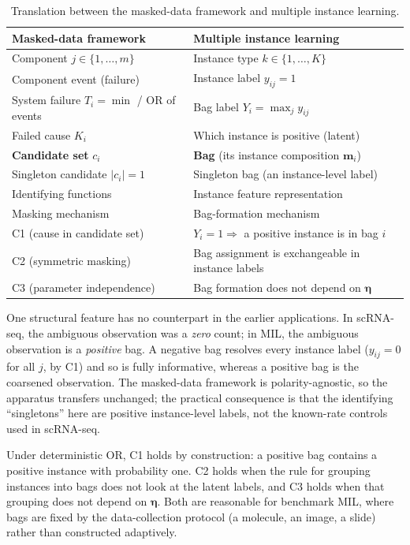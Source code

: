 \begin{table}[ht]
\centering
\small
\begin{tabular}{ll}
\toprule
\textbf{Masked-data framework} & \textbf{Multiple instance learning} \\
\midrule
Component $j \in \{1,\ldots,m\}$ & Instance type $k \in \{1,\ldots,K\}$ \\
Component event (failure) & Instance label $y_{ij} = 1$ \\
System failure $T_i = \min$ / OR of events & Bag label $Y_i = \max_j y_{ij}$ \\
Failed cause $K_i$ & Which instance is positive (latent) \\
\textbf{Candidate set} $c_i$ & \textbf{Bag} (its instance composition $\bm{m}_i$) \\
Singleton candidate $|c_i| = 1$ & Singleton bag (an instance-level label) \\
Identifying functions & Instance feature representation \\
Masking mechanism & Bag-formation mechanism \\
C1 (cause in candidate set) & $Y_i = 1 \Rightarrow$ a positive instance is in bag $i$ \\
C2 (symmetric masking) & Bag assignment is exchangeable in instance labels \\
C3 (parameter independence) & Bag formation does not depend on $\bm{\eta}$ \\
\bottomrule
\end{tabular}
\caption{Translation between the masked-data framework
\citep{towell2026masked} and multiple instance learning.}
\label{tab:translation}
\end{table}

One structural feature has no counterpart in the earlier
applications. In scRNA-seq, the ambiguous observation was a
\emph{zero} count; in MIL, the ambiguous observation is a
\emph{positive} bag. A negative bag resolves every instance label
($y_{ij} = 0$ for all $j$, by C1) and so is fully informative,
whereas a positive bag is the coarsened observation. The
masked-data framework is polarity-agnostic, so the apparatus
transfers unchanged; the practical consequence is that the
identifying ``singletons'' here are positive instance-level labels,
not the known-rate controls used in scRNA-seq.

Under deterministic OR, C1 holds by construction: a positive bag
contains a positive instance with probability one. C2 holds when
the rule for grouping instances into bags does not look at the
latent labels, and C3 holds when that grouping does not depend on
$\bm{\eta}$. Both are reasonable for benchmark MIL, where bags are
fixed by the data-collection protocol (a molecule, an image, a
slide) rather than constructed adaptively.

